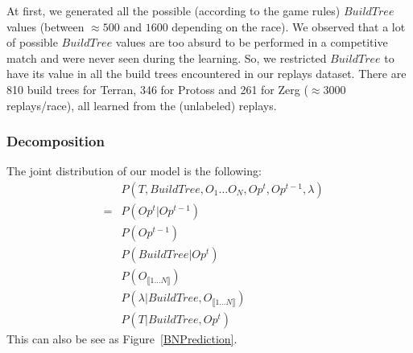 At first, we generated all the possible (according to the game rules) $BuildTree$ values (between $\approx 500$ and $1600$ depending on the race). We observed that a lot of possible $BuildTree$ values are too absurd to be performed in a competitive match and were never seen during the learning. So, we restricted $BuildTree$ to have its value in all the build trees encountered in our replays dataset. 
There are 810 build trees for Terran, 346 for Protoss and 261 for Zerg ($\approx 3000$ replays/race), all learned from the (unlabeled) replays.

\subsubsection{Decomposition}
The joint distribution of our model is the following:
\begin{eqnarray*}
    & & P(T, BuildTree, O_1 \dots O_N, Op^t, Op^{t-1}, \lambda) \\ 
& = &   P(Op^t | Op^{t-1}) \\
    & & P(Op^{t-1}) \\
    & & P(BuildTree | Op^t) \\
    & & P(O_{\llbracket 1 \dots N\rrbracket}) \\
    & & P(\lambda | BuildTree, O_{\llbracket 1 \dots N\rrbracket}) \\
    & & P(T | BuildTree, Op^t) 
\end{eqnarray*}
This can also be see as Figure~\ref{BNPrediction}.

